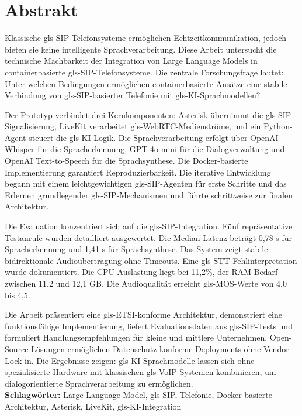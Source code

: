 
\chapter*{Abstrakt}
\thispagestyle{scrheadings}

Klassische \gls{gls-SIP}-Telefonsysteme ermöglichen Echtzeitkommunikation, jedoch bieten sie keine intelligente Sprachverarbeitung. Diese Arbeit untersucht die technische Machbarkeit der Integration von Large Language Models in containerbasierte \gls{gls-SIP}-Telefonsysteme. Die zentrale Forschungsfrage lautet: Unter welchen Bedingungen ermöglichen containerbasierte Ansätze eine stabile Verbindung von \gls{gls-SIP}-basierter Telefonie mit \gls{gls-KI}-Sprachmodellen?

Der Prototyp verbindet drei Kernkomponenten: Asterisk übernimmt die \gls{gls-SIP}-\\Signalisierung, LiveKit verarbeitet \gls{gls-WebRTC}-Medienströme, und ein Python-Agent steuert die \gls{gls-KI}-Logik. Die Sprachverarbeitung erfolgt über OpenAI Whisper für die Spracherkennung, GPT-4o-mini für die Dialogverwaltung und OpenAI Text-to-Speech für die Sprachsynthese. Die Docker-basierte Implementierung garantiert Reproduzierbarkeit. Die iterative Entwicklung begann mit einem leichtgewichtigen \gls{gls-SIP}-Agenten für erste Schritte und das Erlernen grundlegender \gls{gls-SIP}-Mechanismen und führte schrittweise zur finalen Architektur.

Die Evaluation konzentriert sich auf die \gls{gls-SIP}-Integration. Fünf repräsentative Testanrufe wurden detailliert ausgewertet. Die Median-Latenz beträgt 0,78 s für Spracherkennung und 1,41 s für Sprachsynthese. Das System zeigt stabile bidirektionale Audioübertragung ohne Timeouts. Eine \gls{gls-STT}-Fehlinterpretation wurde dokumentiert. Die CPU-Auslastung liegt bei 11,2\%, der RAM-Bedarf zwischen 11,2 und 12,1 GB. Die Audioqualität erreicht \gls{gls-MOS}-Werte von 4,0 bis 4,5.

Die Arbeit präsentiert eine \gls{gls-ETSI}-konforme Architektur, demonstriert eine funktionsfähige Implementierung, liefert Evaluationsdaten aus \gls{gls-SIP}-Tests und formuliert Handlungsempfehlungen für kleine und mittlere Unternehmen. Open-Source-Lösungen ermöglichen Datenschutz-konforme Deployments ohne Vendor-Lock-in. Die Ergebnisse zeigen: \gls{gls-KI}-Sprachmodelle lassen sich ohne spezialisierte Hardware mit klassischen \gls{gls-VoIP}-Systemen kombinieren, um dialogorientierte Sprachverarbeitung zu ermöglichen.\\

\noindent\textbf{Schlagwörter:} Large Language Model, \gls{gls-SIP}, Telefonie, Docker-basierte Architektur, Asterisk, LiveKit, \gls{gls-KI}-Integration
